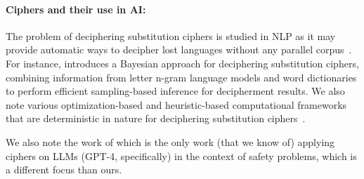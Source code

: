 \documentclass[11pt]{article}
\begin{document}
\paragraph{Ciphers and their use in AI:} The problem of deciphering substitution ciphers is studied in NLP as it may provide automatic ways to  decipher lost languages without any  parallel corpus~\cite[\emph{inter alia}]{knight2006unsupervised,ravi2008attacking,ravi2011bayesian,dou2012large,berg2013unsupervised,pourdamghani2017deciphering,nuhn2013beam,berg2011simple,corlett2010exact,aldarrab2020can}.
For instance,
\citet{ravi2011bayesian} introduces a  Bayesian approach for deciphering  substitution ciphers, combining information from letter n-gram language models and word dictionaries to perform efficient sampling-based inference for decipherment results.
We also note various optimization-based and heuristic-based computational frameworks that are deterministic in nature for deciphering substitution ciphers~\cite{peleg1979breaking,ganesan1993statistical,olson2007robust}.

We also note the work of
\citet{yuan2023gpt} which is the only work (that we know of) applying ciphers on LLMs (GPT-4, specifically) in the context of safety problems, which is a different focus than ours.





\end{document}
